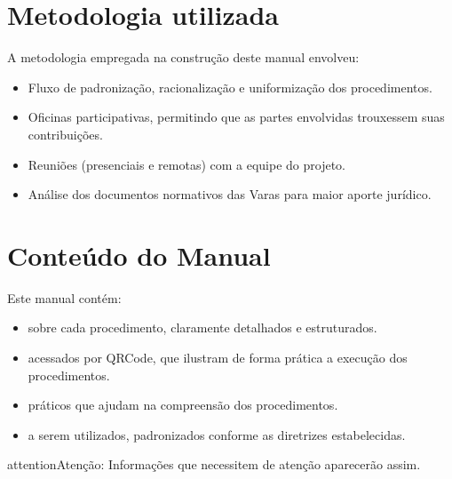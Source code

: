 \documentclass[letterpaper,10pt,brazil]{sphinxmanual}
\begin{document}
\chapter{Metodologia utilizada}
\label{\detokenize{index:metodologia-utilizada}}
\sphinxAtStartPar
A metodologia empregada na construção deste manual envolveu:
\begin{itemize}
\item {} 
\sphinxAtStartPar
Fluxo de padronização, racionalização e uniformização dos procedimentos.

\item {} 
\sphinxAtStartPar
Oficinas participativas, permitindo que as partes envolvidas trouxessem suas contribuições.

\item {} 
\sphinxAtStartPar
Reuniões (presenciais e remotas) com a equipe do projeto.

\item {} 
\sphinxAtStartPar
Análise dos documentos normativos das Varas para maior aporte jurídico.

\end{itemize}


\chapter{Conteúdo do Manual}
\label{\detokenize{index:conteudo-do-manual}}
\sphinxAtStartPar
Este manual contém:
\begin{itemize}
\item {} 
\sphinxAtStartPar
{} sobre cada procedimento, claramente detalhados e estruturados.

\item {} 
\sphinxAtStartPar
{} acessados por QRCode, que ilustram de forma prática a execução dos procedimentos.

\item {} 
\sphinxAtStartPar
{} práticos que ajudam na compreensão dos procedimentos.

\item {} 
\sphinxAtStartPar
{} a serem utilizados, padronizados conforme as diretrizes estabelecidas.

\end{itemize}

\begin{sphinxadmonition}{attention}{Atenção:}
\sphinxAtStartPar
Informações que necessitem de atenção aparecerão assim.
\end{sphinxadmonition}
\end{document}
